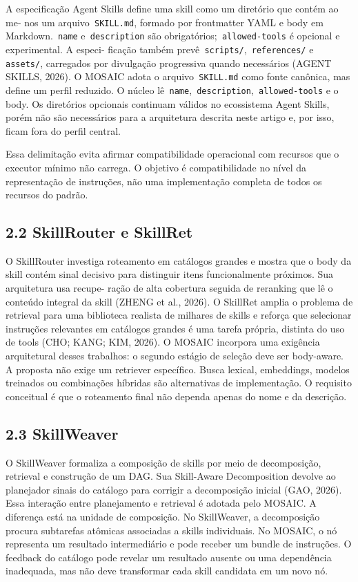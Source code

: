 \documentclass[12pt,a4paper]{article}
\begin{document}
A especificação Agent Skills define uma skill como um diretório que contém ao me- nos um arquivo\texttt{ SKILL.md}, formado por frontmatter YAML e body em Markdown.\texttt{ name} e\texttt{ description} são obrigatórios;\texttt{ allowed-tools} é opcional e experimental. A especi- ficação também prevê\texttt{ scripts/},\texttt{ references/} e\texttt{ assets/}, carregados por divulgação progressiva quando necessários (AGENT SKILLS, 2026). O MOSAIC adota o arquivo\texttt{ SKILL.md} como fonte canônica, mas define um perfil reduzido. O núcleo lê\texttt{ name},\texttt{ description},\texttt{ allowed-tools} e o body. Os diretórios opcionais continuam válidos no ecossistema Agent Skills, porém não são necessários para a arquitetura descrita neste artigo e, por isso, ficam fora do perfil central.


Essa delimitação evita afirmar compatibilidade operacional com recursos que o executor mínimo não carrega. O objetivo é compatibilidade no nível da representação de instruções, não uma implementação completa de todos os recursos do padrão.


\subsection*{2.2 SkillRouter e SkillRet}

O SkillRouter investiga roteamento em catálogos grandes e mostra que o body da skill contém sinal decisivo para distinguir itens funcionalmente próximos. Sua arquitetura usa recupe- ração de alta cobertura seguida de reranking que lê o conteúdo integral da skill (ZHENG et al., 2026). O SkillRet amplia o problema de retrieval para uma biblioteca realista de milhares de skills e reforça que selecionar instruções relevantes em catálogos grandes é uma tarefa própria, distinta do uso de tools (CHO; KANG; KIM, 2026). O MOSAIC incorpora uma exigência arquitetural desses trabalhos: o segundo estágio de seleção deve ser body-aware. A proposta não exige um retriever específico. Busca lexical, embeddings, modelos treinados ou combinações híbridas são alternativas de implementação. O requisito conceitual é que o roteamento final não dependa apenas do nome e da descrição.


\subsection*{2.3 SkillWeaver}

O SkillWeaver formaliza a composição de skills por meio de decomposição, retrieval e construção de um DAG. Sua Skill-Aware Decomposition devolve ao planejador sinais do catálogo para corrigir a decomposição inicial (GAO, 2026). Essa interação entre planejamento e retrieval é adotada pelo MOSAIC. A diferença está na unidade de composição. No SkillWeaver, a decomposição procura subtarefas atômicas associadas a skills individuais. No MOSAIC, o nó representa um resultado intermediário e pode receber um bundle de instruções. O feedback do catálogo pode revelar um resultado ausente ou uma dependência inadequada, mas não deve transformar cada skill candidata em um novo nó.
\end{document}
